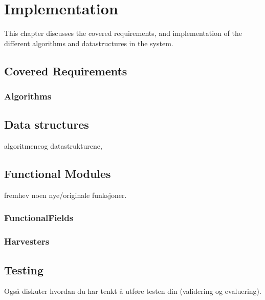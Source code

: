
\chapter{Implementation}

\minitoc

This chapter discusses the covered requirements, and implementation of the different algorithms and datastructures in the system.

\clearpage

\section{Covered Requirements}
\subsection{Algorithms}

\section{Data structures}
algoritmeneog datastrukturene,

\section{Functional Modules}
fremhev noen nye/originale funksjoner.
\subsection{FunctionalFields}
\subsection{Harvesters}

\section{Testing}
Også diskuter hvordan du har tenkt å utføre testen din (validering og evaluering).
